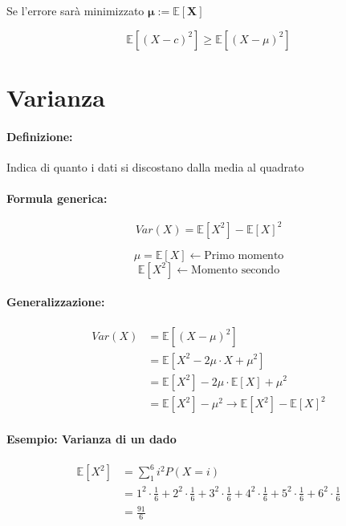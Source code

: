 \documentclass[]{article}
\newcommand{\ev}{\mathbb{E}[X]}
\renewcommand{\ev}[1]{\mathbb{E}[#1]}
\newcommand{\definizione}{\paragraph{Definizione:}}
\newcommand{\formula}{\paragraph{Formula generica:}}
\begin{document}
    \begin{center}
        \hfill
    \end{center}

    
    Se \boldsymbol{$c = \ev{X}$} l'errore sarà minimizzato $\boldsymbol{\mu := \ev{X}}$
    

    \[ \ev{(X - c)^2} \geq \ev{(X - \mu)^2}\]

    \section{Varianza}
    \definizione Indica di quanto i dati si discostano dalla media al quadrato
    \formula \[ Var(X) = \ev{X^2} - \ev{X}^2\]
    
    \[ \mu = \ev{X} \leftarrow \text{Primo momento}\]
    \[ \ev{X^2} \leftarrow \text{Momento secondo}\]

    \paragraph{Generalizzazione:}
    \begin{equation*}
        \begin{split}
            Var(X) & = \ev{(X - \mu)^2} \\
            & = \ev{X^2 - 2 \mu \cdot X + \mu^2} \\
            & = \ev{X^2} - 2 \mu \cdot \ev{X} + \mu^2 \\
            & = \ev{X^2} - \mu^2 \longrightarrow \ev{X^2} - \ev{X}^2
        \end{split}
    \end{equation*}
    
    \paragraph{Esempio: Varianza di un dado}
    \begin{equation*}
        \begin{split}
            \ev{X^2} & = \sum_{1}^{6} i^2 P(X = i) \\
            & = 1^2 \cdot \frac{1}{6} + 2^2 \cdot \frac{1}{6} + 3^2 \cdot \frac{1}{6} + 4^2 \cdot \frac{1}{6} + 5^2 \cdot \frac{1}{6} + 6^2 \cdot \frac{1}{6} \\
            & = \frac{91}{6}
        \end{split}
    \end{equation*}
\end{document}

